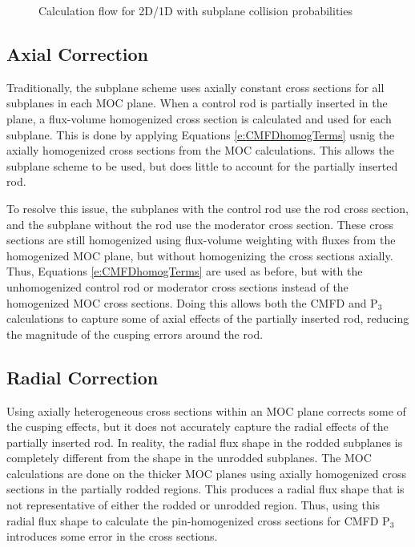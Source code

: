 \begin{figure}[h]
    \centering
    
    \caption{Calculation flow for 2D/1D with subplane collision probabilities}\label{f:SubplaneCP-flowchart}
\end{figure}

\subsection{Axial Correction}

Traditionally, the subplane scheme uses axially constant cross sections for all subplanes in each MOC plane.  When a control rod is partially inserted in the plane, a flux-volume homogenized cross section is calculated and used for each subplane.  This is done by applying Equations \ref{e:CMFDhomogTerms} usnig the axially homogenized cross sections from the MOC calculations.  This allows the subplane scheme to be used, but does little to account for the partially inserted rod.

To resolve this issue, the subplanes with the control rod use the rod cross section, and the subplane without the rod use the moderator cross section.  These cross sections are still homogenized using flux-volume weighting with fluxes from the homogenized MOC plane, but without homogenizing the cross sections axially.  Thus, Equations \ref{e:CMFDhomogTerms} are used as before, but with the unhomogenized control rod or moderator cross sections instead of the homogenized MOC cross sections.  Doing this allows both the CMFD and P$_3$ calculations to capture some of axial effects of the partially inserted rod, reducing the magnitude of the cusping errors around the rod.

\subsection{Radial Correction}

Using axially heterogeneous cross sections within an MOC plane corrects some of the cusping effects, but it does not accurately capture the radial effects of the partially inserted rod.  In reality, the radial flux shape in the rodded subplanes is completely different from the shape in the unrodded subplanes.  The MOC calculations are done on the thicker MOC planes using axially homogenized cross sections in the partially rodded regions.  This produces a radial flux shape that is not representative of either the rodded or unrodded region.  Thus, using this radial flux shape to calculate the pin-homogenized cross sections for CMFD P$_3$ introduces some error in the cross sections.

